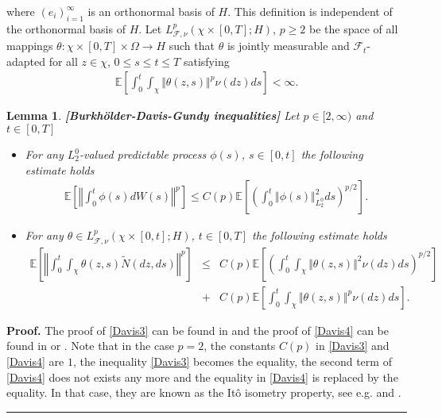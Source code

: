 \documentclass[review,12pt]{elsarticle}
\newtheorem{lemma}{Lemma}[section]
\newenvironment{proof}[1][Proof]{\textbf{#1.} }{\hspace{\stretch{1}}\rule{0.5em}{0.5em}}
\begin{document}
where $(e_i)_{i=1}^{\infty}$ is an orthonormal basis  of $H$.
This definition is independent of the orthonormal basis of $H$.
 Let $L^p_{\mathcal{F}, \nu}(\chi\times[0,T];H)$, $p\geq 2$ be the space of all mappings $\theta :\chi\times[0,T]\times\Omega\longrightarrow H$ such that $\theta$ is jointly measurable and $\mathcal{F}_t$-adapted  for all $z\in\chi$, $0\leq s\leq t\leq T$  satisfying
\begin{eqnarray}
\mathbb{E}\left[\int_0^t\int_{\chi}\Vert \theta(z,s)\Vert^p\nu(dz)ds\right]<\infty.
\end{eqnarray}
\begin{lemma}\textbf{[Burkh\"{o}lder-Davis-Gundy inequalities]}
\label{Davis2}
Let $p\in[2,\infty)$ and $t\in[0, T]$
\begin{itemize}
\item[(i)] For any $L^0_2$-valued predictable process $\phi(s)$, $s\in[0, t]$ the following estimate holds
\begin{eqnarray}
\label{Davis3}
\mathbb{E}\left[\left\Vert\int_0^t\phi(s)dW(s)\right\Vert^p\right]\leq C(p)\mathbb{E}\left[\left(\int_0^t\Vert \phi(s)\Vert^2_{L^0_2}ds\right)^{p/2}\right].
\end{eqnarray}
\item[(ii)] For any $\theta\in L^p_{\mathcal{F}, \nu}(\chi\times[0, t]; H)$, $t\in[0, T]$ the following estimate holds
\begin{eqnarray}
\label{Davis4}
\mathbb{E}\left[\left\Vert\int_0^t\int_{\chi}\theta(z,s)\widetilde{N}(dz, ds)\right\Vert^p\right]&\leq&C(p)\mathbb{E}\left[\left(\int_0^t\int_{\chi}\Vert \theta(z,s)\Vert^2\nu(dz)ds\right)^{p/2}\right]\nonumber\\
&+&C(p)\mathbb{E}\left[\int_0^t\int_{\chi}\Vert \theta(z,s)\Vert^p\nu(dz)ds\right].
\end{eqnarray}
\end{itemize}
\end{lemma}
\begin{proof}
 The proof of \eqref{Davis3} can be found in \cite[Theorem 4.36]{Prato} and the proof of \eqref{Davis4} can be found in  \cite{Hausenblas} or  \cite[Theorem 3.2]{Gundy1}. Note that in the case $p=2$, the constants $C(p)$ in \eqref{Davis3} and \eqref{Davis4} are $1$, the inequality \eqref{Davis3} becomes the equality, the second term of \eqref{Davis4} does not exists any more and the equality in \eqref{Davis4} is replaced by the equality. In that case, they are known as the It\^{o} isometry property, see e.g. \cite[(4.30)]{Prato} and \cite[(3.56)]{Rudiger}. 
\end{proof}
\end{document}
